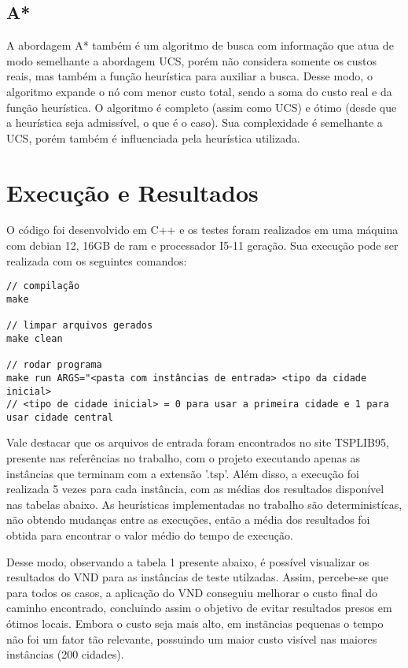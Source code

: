 \documentclass[10pt]{extarticle} %
\begin{document}
\subsection{A*}

A abordagem A* também é um algoritmo de busca com informação que atua de modo semelhante a abordagem UCS, porém não considera somente os custos reais, mas também a função heurística para auxiliar a busca. Desse modo, o algoritmo expande o nó com menor custo total, sendo a soma do custo real e da função heurística. O algoritmo é completo (assim como UCS) e ótimo (desde que a heurística seja admissível, o que é o caso). Sua complexidade é semelhante a UCS, porém também é influenciada pela heurística utilizada.

\section{Execução e Resultados}

O código foi desenvolvido em C++ e os testes foram realizados em uma máquina com debian 12, 16GB de ram e processador I5-11 geração. Sua execução pode ser realizada com os seguintes comandos:

\begin{verbatim}
// compilação
make

// limpar arquivos gerados
make clean

// rodar programa
make run ARGS="<pasta com instâncias de entrada> <tipo da cidade inicial>
// <tipo de cidade inicial> = 0 para usar a primeira cidade e 1 para usar cidade central
\end{verbatim}

Vale destacar que os arquivos de entrada foram encontrados no site TSPLIB95, presente nas referências no trabalho, com o projeto executando apenas as instâncias que terminam com a extensão '.tsp'. Além disso, a execução foi realizada 5 vezes para cada instância, com as médias dos resultados disponível nas tabelas abaixo. As heurísticas implementadas no trabalho são deterministícas, não obtendo mudanças entre as execuções, então a média dos resultados foi obtida para encontrar o valor médio do tempo de execução.

Desse modo, observando a tabela 1 presente abaixo, é possível visualizar os resultados do VND para as instâncias de teste utilzadas. Assim, percebe-se que para todos os casos, a aplicação do VND conseguiu melhorar o custo final do caminho encontrado, concluindo assim o objetivo de evitar resultados presos em ótimos locais. Embora o custo seja mais alto, em instãncias pequenas o tempo não foi um fator tão relevante, possuindo um maior custo visível nas maiores instâncias (200 cidades).
\end{document}
